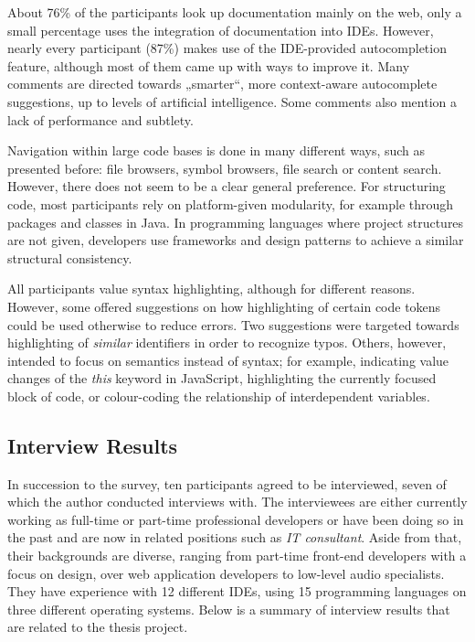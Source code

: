 About 76\% of the participants look up documentation mainly on the web,
only a small percentage uses the integration of documentation into IDEs.
However, nearly every participant (87\%) makes use of the IDE-provided
autocompletion feature, although most of them came up with ways to
improve it. Many comments are directed towards „smarter“, more
context-aware autocomplete suggestions, up to levels of artificial
intelligence. Some comments also mention a lack of performance and
subtlety.

Navigation within large code bases is done in many different ways, such
as presented before: file browsers, symbol browsers, file search or
content search. However, there does not seem to be a clear general
preference. For structuring code, most participants rely on
platform-given modularity, for example through packages and classes in
Java. In programming languages where project structures are not given,
developers use frameworks and design patterns to achieve a similar
structural consistency.

All participants value syntax highlighting, although for different
reasons. However, some offered suggestions on how highlighting of
certain code tokens could be used otherwise to reduce errors. Two
suggestions were targeted towards highlighting of \emph{similar}
identifiers in order to recognize typos. Others, however, intended to
focus on semantics instead of syntax; for example, indicating value
changes of the \emph{this} keyword in JavaScript, highlighting the
currently focused block of code, or colour-coding the relationship of
interdependent variables.

\subsection{Interview Results}\label{interview-results}

In succession to the survey, ten participants agreed to be interviewed,
seven of which the author conducted interviews with. The interviewees
are either currently working as full-time or part-time professional
developers or have been doing so in the past and are now in related
positions such as \emph{IT consultant}. Aside from that, their
backgrounds are diverse, ranging from part-time front-end developers
with a focus on design, over web application developers to low-level
audio specialists. They have experience with 12 different IDEs, using 15
programming languages on three different operating systems. Below is a
summary of interview results that are related to the thesis project.

